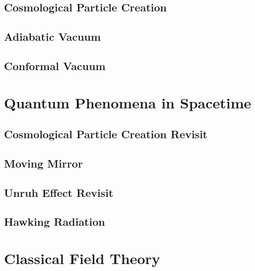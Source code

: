 \documentclass[12pt]{article}
\numberwithin{equation}{section}
\theoremstyle{1style}
\begin{document}
\subsection{Cosmological Particle Creation}

\subsection{Adiabatic Vacuum}

\subsection{Conformal Vacuum}

\section{Quantum Phenomena in Spacetime}


\subsection{Cosmological Particle Creation Revisit}



\subsection{Moving Mirror}


\subsection{Unruh Effect Revisit}
\subsection{Hawking Radiation}


\newpage
\appendix
{}





\section{Classical Field Theory}


\newpage
\newpage
\end{document}

